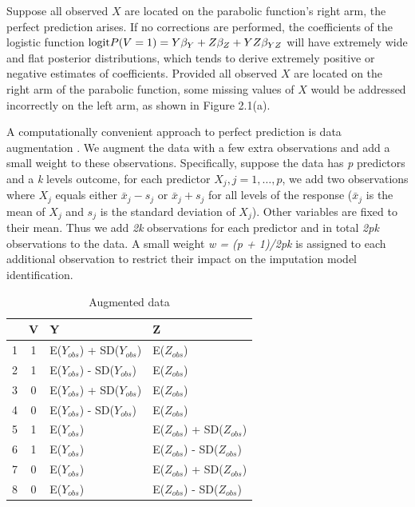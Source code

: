 	Suppose all observed $X$ are located on the parabolic function's right arm, the perfect prediction arises. If no corrections are performed, the coefficients of the logistic function $\textnormal{logit}P(V = 1) = Y\beta_{Y} + Z\beta_{Z} + YZ\beta_{YZ}$ will have extremely wide and flat posterior distributions, which tends to derive extremely positive or negative estimates of coefficients. Provided all observed $X$ are located on the right arm of the parabolic function, some missing values of $X$ would be addressed incorrectly on the left arm, as shown in Figure 2.1(a).
	
	A computationally convenient approach to perfect prediction is data augmentation \citep[Section 3.6.2]{Buuren2018}. We augment the data with a few extra observations and add a small weight to these observations. Specifically, suppose the data has \emph{p} predictors and a \emph{k} levels outcome, for each predictor $X_{j}, j = 1, \dots, p$, we add two observations where $X_{j}$ equals either $\bar{x}_{j} - s_{j}$ or $\bar{x}_{j} + s_{j}$ for all levels of the response ($\bar{x}_{j}$ is the mean of $X_{j}$ and $s_{j}$ is the standard deviation of $X_{j}$). Other variables are fixed to their mean. Thus we add \emph{2k} observations for each predictor and in total \emph{2pk} observations to the data. A small weight \emph{w = (p + 1)/2pk} is assigned to each additional observation to restrict their impact on the imputation model identification. 
	
	\begin{table}[ht!]
		\centering
		\begin{tabular}{c|c|l|l}
			& V & Y                              & Z                              \\\hline
			1 & 1 & E($Y_{obs}$) + SD($Y_{obs}$) & E($Z_{obs}$)                  \\
			2 & 1 & E($Y_{obs}$) - SD($Y_{obs}$) & E($Z_{obs}$)                  \\
			3 & 0 & E($Y_{obs}$) + SD($Y_{obs}$) & E($Z_{obs}$)                  \\
			4 & 0 & E($Y_{obs}$) - SD($Y_{obs}$) & E($Z_{obs}$)                  \\
			5 & 1 & E($Y_{obs}$)                  & E($Z_{obs}$) + SD($Z_{obs}$) \\
			6 & 1 & E($Y_{obs}$)                  & E($Z_{obs}$) - SD($Z_{obs}$) \\
			7 & 0 & E($Y_{obs}$)                  & E($Z_{obs}$) + SD($Z_{obs}$) \\
			8 & 0 & E($Y_{obs}$)                  & E($Z_{obs}$) - SD($Z_{obs}$)
		\end{tabular}
		\caption{Augmented data}
		\label{tab2_2}
	\end{table}
	
